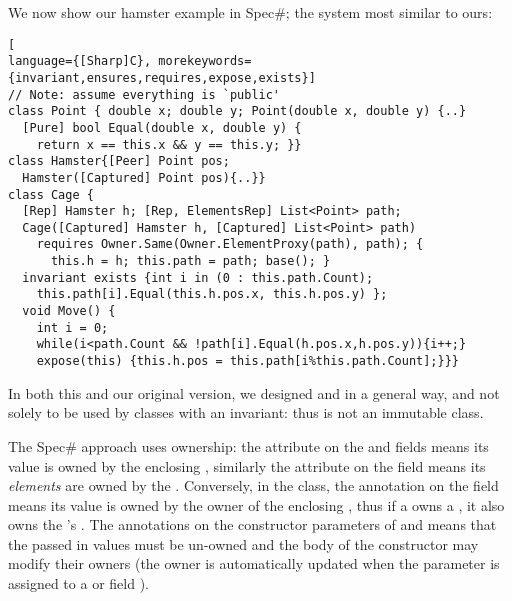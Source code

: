 We now show our hamster example in Spec\#; the system most similar to ours:
\begin{lstlisting}[
language={[Sharp]C}, morekeywords={invariant,ensures,requires,expose,exists}]
// Note: assume everything is `public'
class Point { double x; double y; Point(double x, double y) {..}
  [Pure] bool Equal(double x, double y) {
    return x == this.x && y == this.y; }}
class Hamster{[Peer] Point pos; 
  Hamster([Captured] Point pos){..}}
class Cage {
  [Rep] Hamster h; [Rep, ElementsRep] List<Point> path;
  Cage([Captured] Hamster h, [Captured] List<Point> path)
    requires Owner.Same(Owner.ElementProxy(path), path); {
      this.h = h; this.path = path; base(); }
  invariant exists {int i in (0 : this.path.Count);
    this.path[i].Equal(this.h.pos.x, this.h.pos.y) };
  void Move() {
    int i = 0;
    while(i<path.Count && !path[i].Equal(h.pos.x,h.pos.y)){i++;}
    expose(this) {this.h.pos = this.path[i%this.path.Count];}}}
\end{lstlisting}

In both this and our original version, we designed \Q@Point@ and \Q@Hamster@ in a general way, and not solely to be used by classes with an invariant: thus \Q@Point@ is not an immutable class.

The Spec\# approach uses ownership: the \Q@Rep@ attribute on the \Q@h@ and \Q@path@ fields means its value is owned by the enclosing \Q@Cage@, similarly the \Q@ElementsRep@ attribute on the \Q@path@ field means its \emph{elements} are owned by the \Q@Cage@. Conversely, in the \Q@Hamster@ class, the \Q@Peer@ annotation on the \Q@pos@ field means its value is owned by the owner of the enclosing \Q@Hamster@, thus if a \Q@Cage@ owns a \Q@Hamster@, it also owns the \Q@Hamster@'s \Q@pos@. The \Q@Captured@ annotations on the constructor parameters of \Q@Cage@ and \Q@Hamster@ means that the passed in values must be un-owned and the body of the constructor may modify their owners (the owner is automatically updated when the parameter is assigned to a \Q@Rep@ or \Q@Peer@ field
%
).

